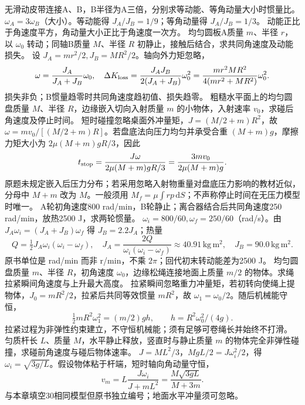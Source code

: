 \problemtext 无滑动皮带连接A、B，B半径为A三倍，分别求等动能、等角动量大小时惯量比。
\workings $\omega_A=3\omega_B$（大小）。等动能得 $J_A/J_B=1/9$；等角动量得 $J_A/J_B=1/3$。
\crosscheck 动能正比于角速度平方，角动量大小正比于角速度一次方。
\problemtext 均匀圆板A质量 $m$、半径 $r$，以 $\omega_0$ 转动；同轴B质量 $M$、半径 $R$ 初静止，接触后结合，求共同角速度及动能损失。
\workings 设 $J_A=mr^2/2,J_B=MR^2/2$。轴向外力矩忽略，
\[
\omega=\frac{J_A}{J_A+J_B}\omega_0,\quad
\Delta K_{\rm loss}=\frac{J_AJ_B}{2(J_A+J_B)}\omega_0^2
=\frac{mr^2MR^2}{4(mr^2+MR^2)}\omega_0^2.
\]
\crosscheck 损失非负；B惯量趋零时共同角速度趋初值、损失趋零。
\problemtext 粗糙水平面上的均匀圆盘质量 $M$、半径 $R$，边缘嵌入切向入射质量 $m$ 的小物体，入射速率 $v_0$，求碰后角速度及停止时间。
\workings 短时碰撞忽略桌面外冲量矩，$J=(M/2+m)R^2$，故 $\omega=mv_0/[(M/2+m)R]$。若盘底法向压力均匀并承受合重 $(M+m)g$，摩擦力矩大小为 $2\mu(M+m)gR/3$，因此
\[
t_{\rm stop}=\frac{J\omega}{2\mu(M+m)gR/3}
=\frac{3mv_0}{2\mu(M+m)g}.
\]
\crosscheck 原题未规定嵌入后压力分布；若采用忽略入射物重量对盘底压力影响的教材近似，分母中 $M+m$ 改为 $M$。一般须用 $M_f=\mu\int r p\,\mathrm dS$；不声称停止时间在无压力模型时唯一。
\problemtext A轮初角速度800 rad/min，B轮静止；离合器结合后共同角速度250 rad/min，放热2500 J，求两轮惯量。
\workings $\omega_i=800/60,\omega_f=250/60$（rad/s）。由 $J_A\omega_i=(J_A+J_B)\omega_f$ 得 $J_B=2.2J_A$；热量
\[
Q=\tfrac12 J_A\omega_i(\omega_i-\omega_f),\quad
J_A=\frac{2Q}{\omega_i(\omega_i-\omega_f)}\approx40.91\,\mathrm{kg\,m^2},
\quad J_B=90.0\,\mathrm{kg\,m^2}.
\]
\crosscheck 原书单位是 rad/min 而非 r/min，不乘 $2\pi$；回代初末转动能差为2500 J。
\problemtext 均匀圆盘质量 $m$、半径 $R$，初角速度 $\omega_0$，边缘松绳连接地面上质量 $m/2$ 的物体。求绳拉紧瞬间角速度与上升最大高度。
\workings 拉紧瞬间忽略重力冲量矩，若初转向使绳上提物体，$J_0=mR^2/2$，拉紧后共同等效惯量 $mR^2$，故 $\omega_1=\omega_0/2$。随后机械能守恒，
\[
\tfrac12mR^2\omega_1^2=(m/2)gh,\qquad h=R^2\omega_0^2/(4g).
\]
\crosscheck 拉紧过程为非弹性约束建立，不守恒机械能；须有足够可卷绳长并始终不打滑。
\problemtext 匀质杆长 $L$、质量 $M$，水平静止释放，竖直时与静止质量 $m$ 的物体完全非弹性碰撞，求碰前角速度与碰后物体速率。
\workings $J=ML^2/3$，$MgL/2=J\omega_i^2/2$，得 $\omega_i=\sqrt{3g/L}$。假设物体粘于杆端，短时轴向角动量守恒，
\[
v_m=L\frac{J\omega_i}{J+mL^2}=\frac{M\sqrt{3gL}}{M+3m}.
\]
\crosscheck 与本章填空30相同模型但原书独立编号；地面水平冲量须可忽略。
